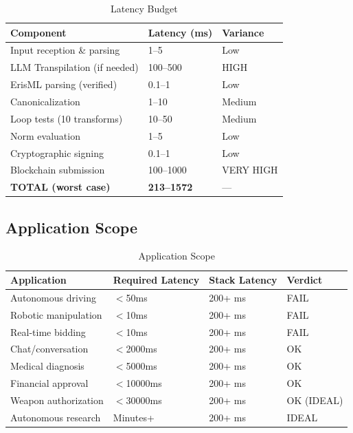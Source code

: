 \documentclass[11pt,letterpaper]{article}
\theoremstyle{definition}
\theoremstyle{remark}
\begin{document}
\begin{table}[h]
\centering
\begin{tabular}{@{}lll@{}}
\toprule
\textbf{Component} & \textbf{Latency (ms)} & \textbf{Variance} \\
\midrule
Input reception \& parsing & 1--5 & Low \\
LLM Transpilation (if needed) & 100--500 & HIGH \\
ErisML parsing (verified) & 0.1--1 & Low \\
Canonicalization & 1--10 & Medium \\
Loop tests (10 transforms) & 10--50 & Medium \\
Norm evaluation & 1--5 & Low \\
Cryptographic signing & 0.1--1 & Low \\
Blockchain submission & 100--1000 & VERY HIGH \\
\textbf{TOTAL (worst case)} & \textbf{213--1572} & --- \\
\bottomrule
\end{tabular}
\caption{Latency Budget}
\end{table}

\subsection{Application Scope}

\begin{table}[h]
\centering
\begin{tabular}{@{}llll@{}}
\toprule
\textbf{Application} & \textbf{Required Latency} & \textbf{Stack Latency} & \textbf{Verdict} \\
\midrule
Autonomous driving & $<$50ms & 200+ ms & FAIL \\
Robotic manipulation & $<$10ms & 200+ ms & FAIL \\
Real-time bidding & $<$10ms & 200+ ms & FAIL \\
Chat/conversation & $<$2000ms & 200+ ms & OK \\
Medical diagnosis & $<$5000ms & 200+ ms & OK \\
Financial approval & $<$10000ms & 200+ ms & OK \\
Weapon authorization & $<$30000ms & 200+ ms & OK (IDEAL) \\
Autonomous research & Minutes+ & 200+ ms & IDEAL \\
\bottomrule
\end{tabular}
\caption{Application Scope}
\end{table}
\end{document}
